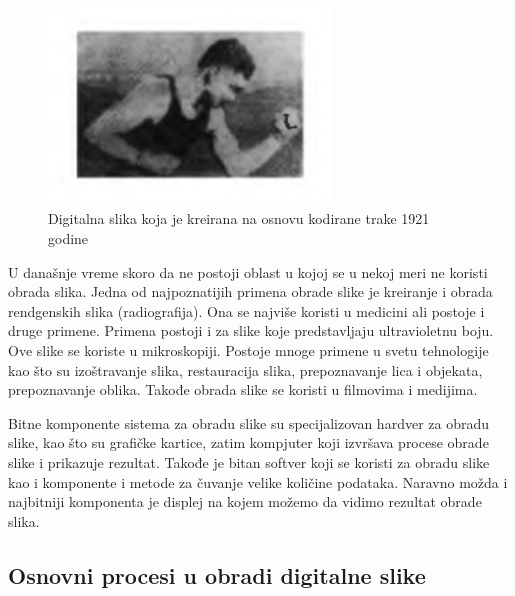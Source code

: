 \documentclass[a4paper,12pt,titlepage]{article}
\begin{document}
\begin{figure}[ht!]
\centering
\includegraphics[width=75mm]{img/prvaPrenesenaSlika.png}
\caption{Digitalna slika koja je kreirana na osnovu kodirane trake 1921 godine}
\label{overflow}
\end{figure} 

U današnje vreme skoro da ne postoji oblast u kojoj se u nekoj meri ne koristi obrada slika. Jedna od najpoznatijih primena obrade slike je kreiranje i obrada rendgenskih slika (radiografija). Ona se najviše koristi u medicini ali postoje i druge primene. Primena postoji i za slike koje predstavljaju ultravioletnu boju. Ove slike se koriste u mikroskopiji. Postoje mnoge primene u svetu tehnologije kao što su izoštravanje slika, restauracija slika, prepoznavanje lica i objekata, prepoznavanje oblika. Takođe obrada slike se koristi u filmovima i medijima.  

Bitne komponente sistema za obradu slike su specijalizovan hardver za obradu slike, kao što su grafičke kartice, zatim kompjuter koji izvršava procese obrade slike i prikazuje rezultat. Takođe je bitan softver koji se koristi za obradu slike kao i komponente i metode za čuvanje velike količine podataka. Naravno možda i najbitniji komponenta je displej na kojem možemo da vidimo rezultat obrade slika.            

\subsection{Osnovni procesi u obradi digitalne slike}%
\end{document}
